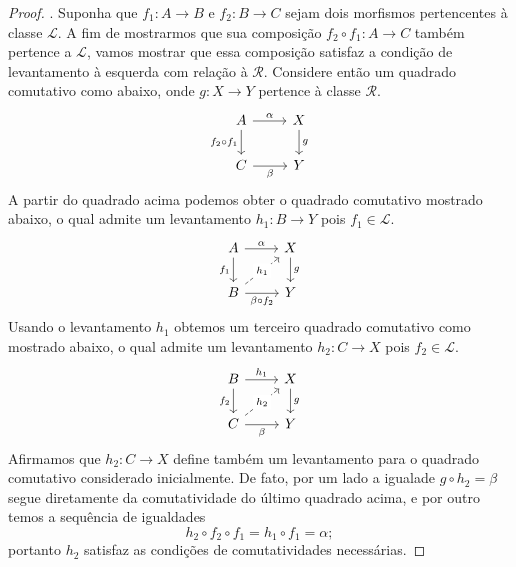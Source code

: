 \begin{proof}
  . Suponha que $f_{1}: A \to B$ e $f_{2}: B \to C$ sejam dois morfismos pertencentes à classe $\mathcal{L}$.
  A fim de mostrarmos que sua composição $f_{2} \circ f_{1}: A \to C$ também pertence a $\mathcal{L}$, vamos mostrar que essa composição satisfaz a condição de levantamento à esquerda com relação à $\mathcal{R}$.
  Considere então um quadrado comutativo como abaixo, onde $g: X \to Y$ pertence à classe $\mathcal{R}$.
  \begin{displaymath}
    \begin{tikzcd}
      A
      \arrow[r, "\alpha"]
      \arrow[d, "f_{2} \circ f_{1}" swap]
      & X
      \arrow[d, "g"]
      \\ C
      \arrow[r, "\beta" swap]
      & Y
    \end{tikzcd}
  \end{displaymath}
  A partir do quadrado acima podemos obter o quadrado comutativo mostrado abaixo, o qual admite um levantamento $h_{1}: B \to Y$ pois $f_{1} \in \mathcal{L}$.
  \begin{displaymath}
    \begin{tikzcd}
      A
      \arrow[r, "\alpha"]
      \arrow[d, "f_{1}" swap]
      & X
      \arrow[d, "g"]
      \\ B
      \arrow[r, "\beta \circ f_{2}" swap]
      \arrow[ru, dashed, "h_{1}" description]
      & Y
    \end{tikzcd}
  \end{displaymath}
  Usando o levantamento $h_{1}$ obtemos um terceiro quadrado comutativo como mostrado abaixo, o qual admite um levantamento $h_{2}: C \to X$ pois $f_{2} \in \mathcal{L}$.
  \begin{displaymath}
    \begin{tikzcd}
      B
      \arrow[r, "h_{1}"]
      \arrow[d, "f_{2}" swap]
      & X
      \arrow[d, "g"]
      \\ C
      \arrow[r, "\beta" swap]
      \arrow[ru, dashed, "h_{2}" description]
      & Y
    \end{tikzcd}
  \end{displaymath}
  Afirmamos que $h_{2}: C \to X$ define também um levantamento para o quadrado comutativo considerado inicialmente.
  De fato, por um lado a igualade $g \circ h_{2} = \beta$ segue diretamente da comutatividade do último quadrado acima, e por outro temos a sequência de igualdades
  \begin{displaymath}
    h_{2} \circ f_{2} \circ f_{1} = h_{1} \circ f_{1} = \alpha;
  \end{displaymath}
  portanto $h_{2}$ satisfaz as condições de comutatividades necessárias.


\end{proof}
